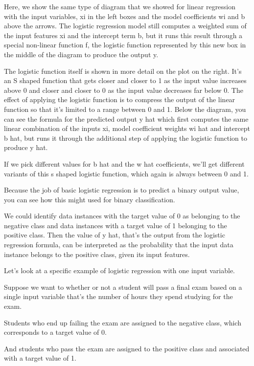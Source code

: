 \begin{multicols}{2}
Here, we show the same type of diagram that we showed for linear regression with the input variables, xi in the left boxes and the model coefficients wi and b above the arrows. The logistic regression model still computes a weighted sum of the input features xi and the intercept term b, but it runs this result through a special non-linear function f, the logistic function represented by this new box in the middle of the diagram to produce the output y. 

The logistic function itself is shown in more detail on the plot on the right. It's an S shaped function that gets closer and closer to 1 as the input value increases above 0 and closer and closer to 0 as the input value decreases far below 0. The effect of applying the logistic function is to compress the output of the linear function so that it's limited to a range between 0 and 1. Below the diagram, you can see the formula for the predicted output y hat which first computes the same linear combination of the inputs xi, model coefficient weights wi hat and intercept b hat, but runs it through the additional step of applying the logistic function to produce y hat. 

If we pick different values for b hat and the w hat coefficients, we'll get different variants of this s shaped logistic function, which again is always between 0 and 1. 

Because the job of basic logistic regression is to predict a binary output value, you can see how this might used for binary classification. 

We could identify data instances with the target value of 0 as belonging to the negative class and data instances with a target value of 1 belonging to the positive class. Then the value of y hat, that's the output from the logistic regression formula, can be interpreted as the probability that the input data instance belongs to the positive class, given its input features. 

Let's look at a specific example of logistic regression with one input variable. 

Suppose we want to whether or not a student will pass a final exam based on a single input variable that's the number of hours they spend studying for the exam. 

Students who end up failing the exam are assigned to the negative class, which corresponds to a target value of 0. 

And students who pass the exam are assigned to the positive class and associated with a target value of 1. 


\end{multicols}
